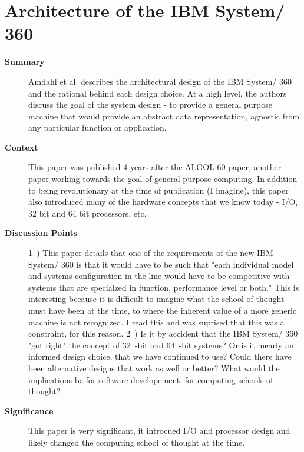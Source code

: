 \section {Architecture of the IBM System/ 360 \cite{amdahl1964architecture}}

\begin{description}
    \item[\textbf{Summary}]
    Amdahl et al. describes the architectural design of the IBM System/ 360 and
    the rational behind each design choice. At a high level, the authors discuss
    the goal of the system design - to provide a general purpose machine that
    would provide an abstract data representation, agnostic from any particular
    function or application.
    \item[\textbf{Context}]
    This paper was published 4 years after the ALGOL 60 paper, another paper
    working towards the goal of general purpose computing. In addition to being
    revolutionary at the time of publication (I imagine), this paper also
    introduced many of the hardware concepts that we know today - I/O, 32 bit
    and 64 bit processors, etc.
    \item[\textbf{Discussion Points}]
    1~) This paper details that one of the requirements of the new IBM System/
    360 is that it would have to be such that "each individual model and
    systems configuration in the line would have to be competitive with systems
    that are specialzed in function, performance level or both." This is
    interesting because it is difficult to imagine what the school-of-thought
    must have been at the time, to where the inherent value of a more generic
    machine is not recognized. I read this and was suprised that this was a
    constraint, for this reason.
    2~) Is it by accident that the IBM System/ 360 "got right" the concept of
    32~-bit and 64~-bit systems? Or is it mearly an informed design choice, that
    we have continued to use? Could there have been alternative designs that
    work as well or better? What would the implications be for software
    developement, for computing schools of thought?
    \item[\textbf{Significance}]
    This paper is very significant, it introcued I/O and processor design and
    likely changed the computing school of thought at the time.
\end{description}